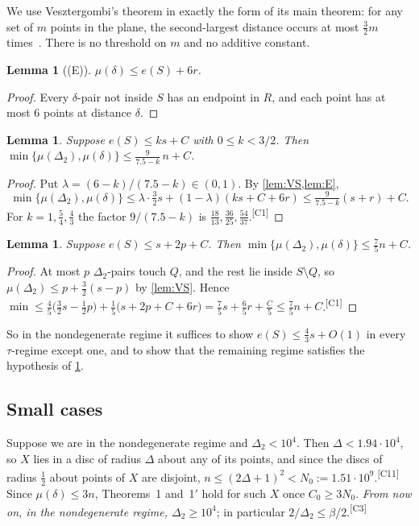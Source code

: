 \documentclass[11pt]{amsart}
\newtheorem{lemma}[theorem]{Lemma}
\theoremstyle{definition}
\theoremstyle{remark}
\newcommand{\Dt}{\Delta_2}
\newcommand{\mult}{\mu}
\newcommand{\chk}[1]{\textsuperscript{[#1]}}
\begin{document}
We use Vesztergombi's theorem in exactly the form of its main theorem: for any set of $m$ points in the plane, the second-largest distance occurs at most $\frac32 m$ times~\cite[Theorem]{Ve87}. There is no threshold on $m$ and no additive constant.

\begin{lemma}[(E)]\label{lem:E}
$\mult(\delta)\le e(S)+6r$.
\end{lemma}
\begin{proof}
Every $\delta$-pair not inside $S$ has an endpoint in $R$, and each point has at most $6$ points at distance $\delta$.
\end{proof}

\begin{lemma}\label{lem:lp}
Suppose $e(S)\le k s+C$ with $0\le k<3/2$. Then $\min\{\mult(\Dt),\mult(\delta)\}\le \frac{9}{7.5-k}\,n+C$.
\end{lemma}
\begin{proof}
Put $\lambda=(6-k)/(7.5-k)\in(0,1)$. By \cref{lem:VS,lem:E},
\[
\min\{\mult(\Dt),\mult(\delta)\}\le\lambda\cdot\tfrac32 s+(1-\lambda)(ks+C+6r)\le \tfrac{9}{7.5-k}(s+r)+C.
\]
For $k=1,\frac54,\frac43$ the factor $9/(7.5-k)$ is $\frac{18}{13},\frac{36}{25},\frac{54}{37}$.\chk{C1}
\end{proof}

\begin{lemma}\label{lem:lp2}
Suppose $e(S)\le s+2p+C$. Then $\min\{\mult(\Dt),\mult(\delta)\}\le\frac75 n+C$.
\end{lemma}
\begin{proof}
At most $p$ $\Dt$-pairs touch $Q$, and the rest lie inside $S\setminus Q$, so $\mult(\Dt)\le p+\frac32(s-p)$ by \cref{lem:VS}. Hence
$\min\le\frac45\bigl(\frac32 s-\frac12p\bigr)+\frac15\bigl(s+2p+C+6r\bigr)=\frac75 s+\frac65 r+\frac C5\le\frac75n+C$.\chk{C1}
\end{proof}

So in the nondegenerate regime it suffices to show $e(S)\le\frac43 s+O(1)$ in every $\tau$-regime except one, and to show that the remaining regime satisfies the hypothesis of \cref{lem:lp2}.

\subsection*{Small cases}
Suppose we are in the nondegenerate regime and $\Dt<10^4$. Then $\Delta<1.94\cdot10^4$, so $X$ lies in a disc of radius $\Delta$ about any of its points, and since the discs of radius $\frac12$ about points of $X$ are disjoint, $n\le(2\Delta+1)^2<N_0:=1.51\cdot10^9$.\chk{C11} Since $\mult(\delta)\le 3n$, Theorems~1 and~1$'$ hold for such $X$ once $C_0\ge 3N_0$. \emph{From now on, in the nondegenerate regime, $\Dt\ge 10^4$}; in particular $2/\Dt\le\beta/2$.\chk{C3}
\end{document}
